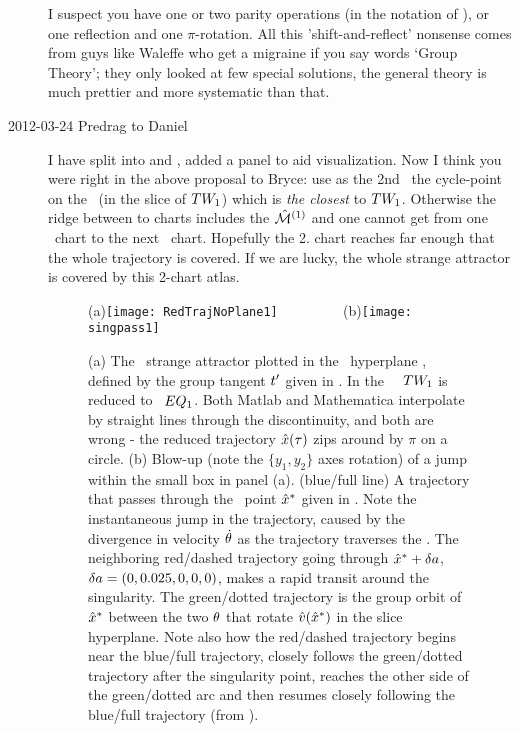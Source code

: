 \begin{description}
I suspect you have one or two parity operations (in the notation of
), or one reflection and one $\pi$-rotation. All this
'shift-and-reflect' nonsense comes from guys like Waleffe who get a
migraine if you say words `Group Theory'; they only looked at few special
solutions, the general theory is much prettier and more systematic than
that.

\item[2012-03-24 Predrag to Daniel]
I have split  into
 and , added a panel to
aid visualization. Now I think you were right in the above proposal to
Bryce:
use as the 2nd
\template\ the cycle-point on the  \po\ (in the slice of
$TW_{1}$) which is \emph{the closest} to $TW_{1}$. Otherwise
the ridge between to charts includes the $\hat{\cal M}{}^{(1)}$ {\chartBord}
and one cannot get from one \template\ chart to the next \template\ chart.
Hopefully the 2. chart reaches far enough that the whole 
trajectory is covered. If we are lucky, the whole strange attractor is
covered by this 2-chart atlas.

 \begin{figure}
 \begin{center}
(a)\texttt{[image: RedTrajNoPlane1]}%
~~~~~~~~
(b)\texttt{[image: singpass1]}%
 \end{center}
 \caption{\label{fig:Fullspace} %
(a) The \cLe\ strange attractor plotted in the \slice\ hyperplane
, defined by the group tangent $t'_{}$ given in
. In the \reducedsp\ \reqv\ $TW_{1}$ is reduced to
\eqv\ $EQ_{1}$. Both Matlab and Mathematica interpolate by straight lines
through the {\chartBord} discontinuity, and both are wrong - the
reduced trajectory $\hat{x}(\tau)$ zips around by $\pi$ on a circle.
(b)
Blow-up (note the $\{y_1,y_2\}$ axes rotation) of a jump within the small
box in panel (a). (blue/full line) A trajectory that passes through the
\chartBord\ point $\hat{x}^\ast$ given in . Note the
instantaneous jump in the trajectory,  caused by the divergence in
velocity $\dot{\theta}$ as the trajectory traverses the {\chartBord}.
The neighboring red/dashed trajectory going through $\hat{x}^\ast+\delta
a$, $\delta a =(0,0.025,0,0,0)$, makes a rapid transit around the
singularity. The green/dotted trajectory is the group orbit of
$\hat{x}^\ast$ between the two $\theta$ that rotate $\hat{v}(\hat{x}^\ast)$ in the
slice hyperplane. Note also how the red/dashed trajectory begins near the
{blue/full} trajectory, closely follows the {green/dotted}
trajectory after the singularity point, reaches the other side of the
{green/dotted} arc and then resumes closely following the
{blue/full} trajectory (from ).
    }%
 \end{figure}


\end{description}
